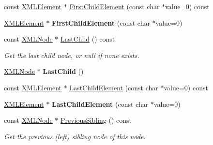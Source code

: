 \begin{DoxyCompactItemize}
const \hyperlink{classtinyxml2_1_1XMLElement}{X\+M\+L\+Element} $\ast$ \hyperlink{classtinyxml2_1_1XMLNode_aa58edaa23984619930a3ab99b31fbf3d}{First\+Child\+Element} (const char $\ast$value=0) const
\item 
\mbox{\label{classtinyxml2_1_1XMLNode_a7614c3b4eea1ff11b2aa90b0f92f6dba}} 
\hyperlink{classtinyxml2_1_1XMLElement}{X\+M\+L\+Element} $\ast$ {\bfseries First\+Child\+Element} (const char $\ast$value=0)
\item 
\mbox{\label{classtinyxml2_1_1XMLNode_a9b8583a277e8e26f4cbbb5492786778e}} 
const \hyperlink{classtinyxml2_1_1XMLNode}{X\+M\+L\+Node} $\ast$ \hyperlink{classtinyxml2_1_1XMLNode_a9b8583a277e8e26f4cbbb5492786778e}{Last\+Child} () const
\begin{DoxyCompactList}\small\item\em Get the last child node, or null if none exists. \end{DoxyCompactList}\item 
\mbox{\label{classtinyxml2_1_1XMLNode_ad7552c8cb1dc0cb6f3bdc14a9d115dbf}} 
\hyperlink{classtinyxml2_1_1XMLNode}{X\+M\+L\+Node} $\ast$ {\bfseries Last\+Child} ()
\item 
const \hyperlink{classtinyxml2_1_1XMLElement}{X\+M\+L\+Element} $\ast$ \hyperlink{classtinyxml2_1_1XMLNode_ac677414bce73321f0604dcee45541a8c}{Last\+Child\+Element} (const char $\ast$value=0) const
\item 
\mbox{\label{classtinyxml2_1_1XMLNode_a125423acf3170b130634638c5afc0639}} 
\hyperlink{classtinyxml2_1_1XMLElement}{X\+M\+L\+Element} $\ast$ {\bfseries Last\+Child\+Element} (const char $\ast$value=0)
\item 
\mbox{\label{classtinyxml2_1_1XMLNode_aac667c513d445f8b783e1e15ef9d3551}} 
const \hyperlink{classtinyxml2_1_1XMLNode}{X\+M\+L\+Node} $\ast$ \hyperlink{classtinyxml2_1_1XMLNode_aac667c513d445f8b783e1e15ef9d3551}{Previous\+Sibling} () const
\begin{DoxyCompactList}\small\item\em Get the previous (left) sibling node of this node. \end{DoxyCompactList}\item 
\mbox{\label{classtinyxml2_1_1XMLNode_ae760e5e7e766df1d2cf3bb4a847876d6}} 

\end{DoxyCompactItemize}
